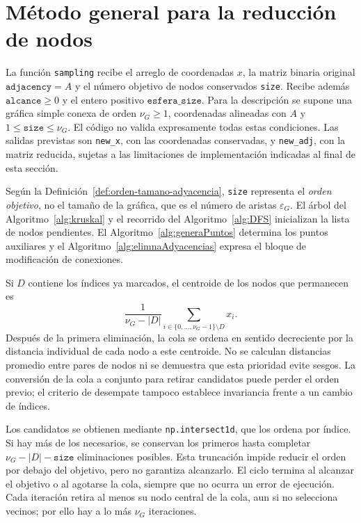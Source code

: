 \section{Método general para la reducción de nodos}

La función \texttt{sampling} recibe el arreglo de coordenadas $x$, la matriz binaria original $\texttt{adjacency}=A$ y el número objetivo de nodos conservados \texttt{size}. Recibe además $\texttt{alcance}\geq0$ y el entero positivo $\texttt{esfera\_size}$. Para la descripción se supone una gráfica simple conexa de orden $\nu_G\geq1$, coordenadas alineadas con $A$ y $1\leq\texttt{size}\leq\nu_G$. El código no valida expresamente todas estas condiciones. Las salidas previstas son \texttt{new\_x}, con las coordenadas conservadas, y \texttt{new\_adj}, con la matriz reducida, sujetas a las limitaciones de implementación indicadas al final de esta sección.

Según la Definición~\ref{def:orden-tamano-adyacencia}, \texttt{size} representa el \emph{orden objetivo}, no el tamaño de la gráfica, que es el número de aristas $\varepsilon_G$. El árbol del Algoritmo~\ref{alg:kruskal} y el recorrido del Algoritmo~\ref{alg:DFS} inicializan la lista de nodos pendientes. El Algoritmo~\ref{alg:generaPuntos} determina los puntos auxiliares y el Algoritmo~\ref{alg:elimnaAdyacencias} expresa el bloque de modificación de conexiones.

Si $D$ contiene los índices ya marcados, el centroide de los nodos que permanecen es
\[
\frac{1}{\nu_G-|D|}\sum_{i\in\{0,\ldots,\nu_G-1\}\setminus D}x_i.
\]
Después de la primera eliminación, la cola se ordena en sentido decreciente por la distancia individual de cada nodo a este centroide. No se calculan distancias promedio entre pares de nodos ni se demuestra que esta prioridad evite sesgos. La conversión de la cola a conjunto para retirar candidatos puede perder el orden previo; el criterio de desempate tampoco establece invariancia frente a un cambio de índices.

Los candidatos se obtienen mediante \texttt{np.intersect1d}, que los ordena por índice. Si hay más de los necesarios, se conservan los primeros hasta completar $\nu_G-|D|-\texttt{size}$ eliminaciones posibles. Esta truncación impide reducir el orden por debajo del objetivo, pero no garantiza alcanzarlo. El ciclo termina al alcanzar el objetivo o al agotarse la cola, siempre que no ocurra un error de ejecución. Cada iteración retira al menos su nodo central de la cola, aun si no selecciona vecinos; por ello hay a lo más $\nu_G$ iteraciones.

